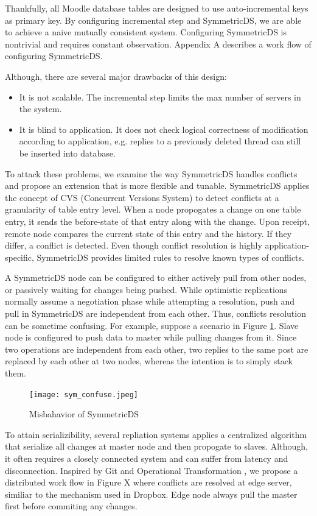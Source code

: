 Thankfully, all Moodle database tables are designed to use auto-incremental keys as primary key. By configuring incremental step and SymmetricDS, we are able to achieve a naive mutually consistent system. Configuring SymmetricDS is nontrivial and requires constant observation. Appendix A describes a work flow of configuring SymmetricDS.

Although, there are several major drawbacks of this design:
\begin{itemize}
\item It is not scalable. The incremental step limits the max number of servers in the system.
\item It is blind to application. It does not check logical correctness of modification according to application, e.g. replies to a previously deleted thread can still be inserted into database.
\end{itemize}

To attack these problems, we examine the way SymmetricDS handles conflicts and propose an extension that is more flexible and tunable. SymmetricDS applies the concept of CVS (Concurrent Versions System) to detect conflicts at a granularity of table entry level. When a node propogates a change on one table entry, it sends the before-state of that entry along with the change. Upon receipt, remote node compares the current state of this entry and the history. If they differ, a conflict is detected. Even though conflict resolution is highly application-specific, SymmetricDS provides limited rules to resolve known types of conflicts.

A SymmetricDS node can be configured to either actively pull from other nodes, or passively waiting for changes being pushed. While optimistic replications normally assume a negotiation phase while attempting a resolution, push and pull in SymmetricDS are independent from each other. Thus, conflicts resolution can be sometime confusing. For example, suppose a scenario in Figure \ref{sym_confuse}. Slave node is configured to push data to master while pulling changes from it. Since two operations are independent from each other, two replies to the same post are replaced by each other at two nodes, whereas the intention is to simply stack them.

\begin{figure}[htbp]
\centering
\texttt{[image: sym\_confuse.jpeg]}
\caption{Misbahavior of SymmetricDS}
\label{sym_confuse}
\end{figure}

To attain serializibility, several repliation systems applies a centralized algorithm that serialize all changes at master node and then propogate to slaves. Although, it often requires a closely connected system and can suffer from latency and disconnection. Inspired by Git and Operational Transformation \cite{ellis1989concurrency}, we propose a distributed work flow in Figure X where conflicts are resolved at edge server, similiar to the mechanism used in Dropbox\cite{dropbox}. Edge node always pull the master first before commiting any changes. 

